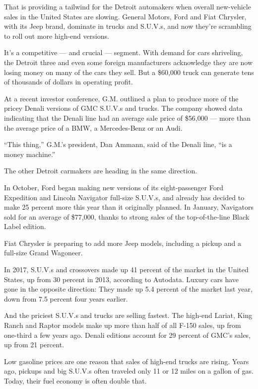 That is providing a tailwind for the Detroit automakers when overall
new-vehicle sales in the United States are slowing. General Motors, Ford
and Fiat Chrysler, with its Jeep brand, dominate in trucks and S.U.V.s,
and now they're scrambling to roll out more high-end versions.

It's a competitive --- and crucial --- segment. With demand for cars
shriveling, the Detroit three and even some foreign manufacturers
acknowledge they are now losing money on many of the cars they sell. But
a \$60,000 truck can generate tens of thousands of dollars in operating
profit.

At a recent investor conference, G.M. outlined a plan to produce more of
the pricey Denali versions of GMC S.U.V.s and trucks. The company showed
data indicating that the Denali line had an average sale price of
\$56,000 --- more than the average price of a BMW, a Mercedes-Benz or an
Audi.

``This thing,'' G.M.'s president, Dan Ammann, said of the Denali line,
``is a money machine.''

The other Detroit carmakers are heading in the same direction.

In October, Ford began making new versions of its eight-passenger Ford
Expedition and Lincoln Navigator full-size S.U.V.s, and already has
decided to make 25 percent more this year than it originally planned. In
January, Navigators sold for an average of \$77,000, thanks to strong
sales of the top-of-the-line Black Label edition.

Fiat Chrysler is preparing to add more Jeep models, including a pickup
and a full-size Grand Wagoneer.

In 2017, S.U.V.s and crossovers made up 41 percent of the market in the
United States, up from 30 percent in 2013, according to Autodata. Luxury
cars have gone in the opposite direction: They made up 5.4 percent of
the market last year, down from 7.5 percent four years earlier.

And the priciest S.U.V.s and trucks are selling fastest. The high-end
Lariat, King Ranch and Raptor models make up more than half of all F-150
sales, up from one-third a few years ago. Denali editions account for 29
percent of GMC's sales, up from 21 percent.

Low gasoline prices are one reason that sales of high-end trucks are
rising. Years ago, pickups and big S.U.V.s often traveled only 11 or 12
miles on a gallon of gas. Today, their fuel economy is often double
that.

